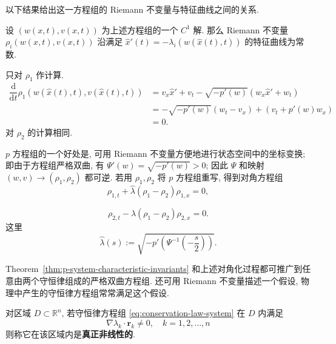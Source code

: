以下结果给出这一方程组的 Riemann 不变量与特征曲线之间的关系.

\begin{Theorem}
\label{thm:p-system-characteristic-invariants}
设 $(w(x,t),v(x,t))$ 为上述方程组的一个 $C^1$ 解. 那么 Riemann 不变量 $\rho_i(w(x,t),v(x,t))$ 沿满足 $\hat x'(t)=-\lambda_i(w(\hat x(t),t))$ 的特征曲线为常数.
\end{Theorem}

\begin{Proof}
只对 $\rho_1$ 作计算.
\[
\begin{aligned}
\dfrac{\mathrm{d}}{\mathrm{d}t}\rho_1(w(\hat x(t),t),v(\hat x(t),t))
&=v_x\hat x'+v_t-\sqrt{-p'(w)}(w_x\hat x'+w_t)\\
&=-\sqrt{-p'(w)}(w_t-v_x)+(v_t+p'(w)w_x)\\
&=0.
\end{aligned}
\]
对 $\rho_2$ 的计算相同.
\end{Proof}

$p$ 方程组的一个好处是, 可用 Riemann 不变量方便地进行状态空间中的坐标变换; 即由于方程组严格双曲, 有 $\Psi'(w)=\sqrt{-p'(w)}>0$; 因此 $\Psi$ 和映射 $(w,v)\to(\rho_1,\rho_2)$ 都可逆. 若用 $\rho_1,\rho_2$ 将 $p$ 方程组重写, 得到对角方程组
\begin{equation}\label{eq:p-system-diagonal-first}
\rho_{1,t}+\hat\lambda(\rho_1-\rho_2)\rho_{1,x}=0,
\end{equation}

\begin{equation}\label{eq:p-system-diagonal-second}
\rho_{2,t}-\hat\lambda(\rho_1-\rho_2)\rho_{2,x}=0.
\end{equation}
这里
\begin{equation}\label{eq:p-system-diagonal-speed}
\hat\lambda(s):=\sqrt{-p'\left(\Psi^{-1}\left(-\dfrac{s}{2}\right)\right)}.
\end{equation}


Theorem~\ref{thm:p-system-characteristic-invariants} 和上述对角化过程都可推广到任意由两个守恒律组成的严格双曲方程组. 还可用 Riemann 不变量描述一个假设, 物理中产生的守恒律方程组常常满足这个假设.

\begin{Definition}
\label{def:genuine-nonlinearity}
对区域 $D\subset\mathbb{R}^n$, 若守恒律方程组 \eqref{eq:conservation-law-system} 在 $D$ 内满足
\begin{equation}\label{eq:genuine-nonlinearity-definition}
\nabla\lambda_k\cdot\bm{r}_k\ne0,\quad k=1,2,\ldots,n
\end{equation}
则称它在该区域内是\textbf{真正非线性的}.
\end{Definition}

